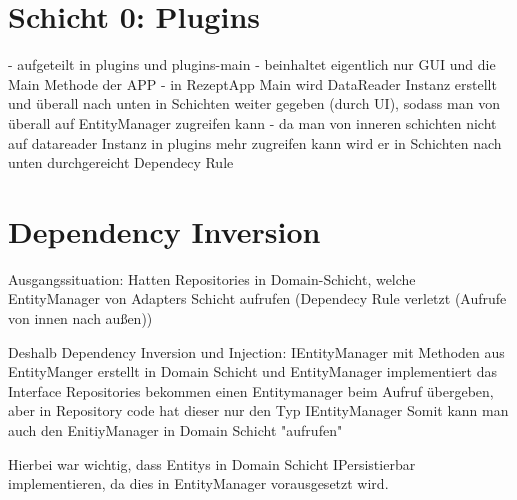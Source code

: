 \section{Schicht 0: Plugins}


- aufgeteilt in plugins und plugins-main
- beinhaltet eigentlich nur GUI und die Main Methode der APP 
- in RezeptApp Main wird DataReader Instanz erstellt und überall nach unten in Schichten weiter gegeben (durch UI), sodass man von überall auf EntityManager zugreifen kann 
- da man von inneren schichten nicht auf datareader Instanz in plugins mehr zugreifen kann wird er in Schichten nach unten durchgereicht Dependecy Rule

\section{Dependency Inversion}

Ausgangssituation: Hatten Repositories in Domain-Schicht, welche EntityManager von Adapters Schicht aufrufen (Dependecy Rule verletzt (Aufrufe von innen nach außen))

Deshalb Dependency Inversion und Injection: 
IEntityManager mit Methoden aus EntityManger erstellt in Domain Schicht und EntityManager implementiert das Interface
Repositories bekommen einen Entitymanager beim Aufruf übergeben, aber in Repository code hat dieser nur den Typ IEntityManager
Somit kann man auch den EnitiyManager in Domain Schicht "aufrufen"

Hierbei war wichtig, dass Entitys in Domain Schicht IPersistierbar implementieren, da dies in EntityManager vorausgesetzt wird. 
